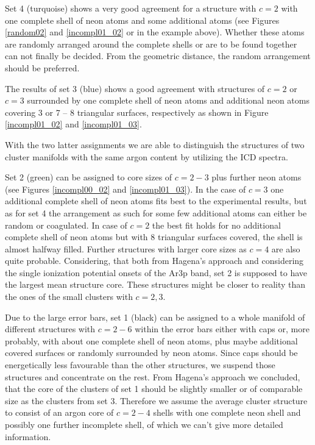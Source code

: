 Set 4 (turquoise) shows a very good agreement for a structure with $c=2$ with one
complete shell of neon atoms and some additional atoms (see Figures
\ref{random02} and \ref{incompl01_02} or in the example above). Whether these atoms are
randomly arranged around the complete shells or are to be found together can not
finally be decided. From the geometric distance, the random arrangement should
be preferred.

The results of set 3 (blue) shows a good agreement with structures
of $c=2$ or $c=3$ surrounded by one complete shell of neon atoms and additional
neon atoms covering 3 or 7 -- 8 triangular surfaces, respectively 
as shown in Figure \ref{incompl01_02} and \ref{incompl01_03}. 

With the two latter assignments we are able to distinguish
the structures of two cluster manifolds with the same argon content by utilizing the
ICD spectra.

Set 2 (green) can be assigned to core sizes of $c=2-3$ plus further neon atoms
(see Figures \ref{incompl00_02} and \ref{incompl01_03}).
In the case of $c=3$ one additional complete shell of neon atoms fits
best to the experimental results, but as for set 4 the arrangement as such for
some few additional atoms can either be random or coagulated.
In case of $c=2$ the best fit holds for no additional complete shell of
neon atoms but with 8 triangular surfaces covered, the shell is almost halfway filled.
Further structures with larger core sizes as $c=4$
are also quite probable. Considering, that 
both from Hagena's approach and considering the single ionization potential
onsets of the Ar3p band, set 2 is supposed to have the largest mean structure
core. These structures might be closer to reality than the ones of the small clusters
with $c=2,3$.

Due to the large error bars, set 1 (black) can be assigned to a whole manifold
of different structures with $c = 2 - 6$ within the error bars
either with caps or, more probably,
with about one complete shell of neon atoms, plus maybe additional covered surfaces
or randomly surrounded by neon atoms. Since caps should be energetically less
favourable than the other structures, we suspend those structures and concentrate
on the rest.
From Hagena's approach we concluded, that the core of the clusters of set 1
should be slightly
smaller or of comparable size as the clusters from set 3. Therefore we assume
the average cluster structure to consist of an argon core of $c=2-4$ shells
with one complete neon shell and possibly one further incomplete shell, of
which we can't give more detailed information.


